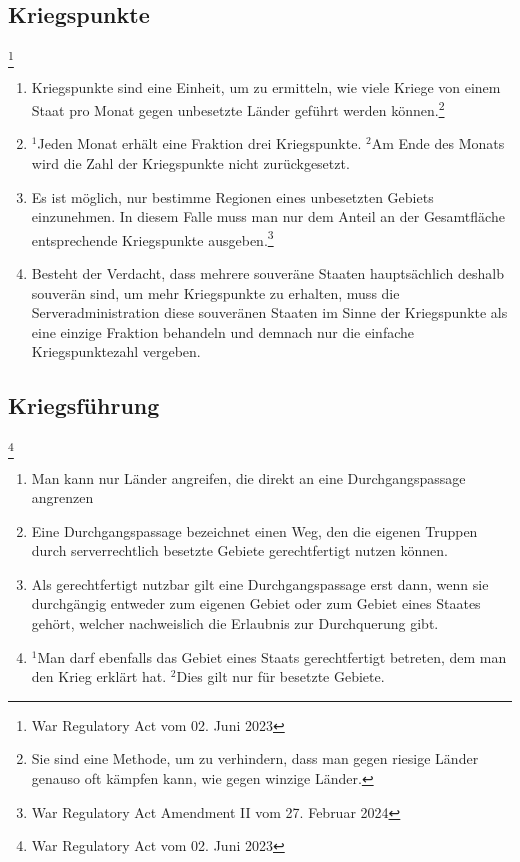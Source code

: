 \documentclass{article}
\newcommand{\sent}[1]{$^{#1}$}
\begin{document}
\subsection{Kriegspunkte}\footnote{War Regulatory Act vom 02. Juni 2023}
\begin{enumerate}[(1)]
	\item Kriegspunkte sind eine Einheit, um zu ermitteln, wie viele Kriege von einem Staat pro Monat gegen unbesetzte Länder geführt werden können.\footnote{Sie sind eine Methode, um zu verhindern, dass man gegen riesige Länder genauso oft kämpfen kann, wie gegen winzige Länder.}
	\item \sent{1}Jeden Monat erhält eine Fraktion drei Kriegspunkte. \sent{2}Am Ende des Monats wird die Zahl der Kriegspunkte nicht zurückgesetzt. %
	\item Es ist möglich, nur bestimme Regionen eines unbesetzten Gebiets einzunehmen. In diesem Falle muss man nur dem Anteil an der Gesamtfläche entsprechende Kriegspunkte ausgeben.\footnote{War Regulatory Act Amendment II vom 27. Februar 2024}
	\item Besteht der Verdacht, dass mehrere souveräne Staaten hauptsächlich deshalb souverän sind, um mehr Kriegspunkte zu erhalten, muss die Serveradministration diese souveränen Staaten im Sinne der Kriegspunkte als eine einzige Fraktion behandeln und demnach nur die einfache Kriegspunktezahl vergeben. %
\end{enumerate}

\subsection{Kriegsführung}\footnote{War Regulatory Act vom 02. Juni 2023}
\begin{enumerate}[(1)]
	\item Man kann nur Länder angreifen, die direkt an eine Durchgangspassage angrenzen
	\item Eine Durchgangspassage bezeichnet einen Weg, den die eigenen Truppen durch serverrechtlich besetzte Gebiete gerechtfertigt nutzen können.
	\item Als gerechtfertigt nutzbar gilt eine Durchgangspassage erst dann, wenn sie durchgängig entweder zum eigenen Gebiet oder zum Gebiet eines Staates gehört, welcher nachweislich die Erlaubnis zur Durchquerung gibt.
	\item \sent{1}Man darf ebenfalls das Gebiet eines Staats gerechtfertigt betreten, dem man den Krieg erklärt hat. \sent{2}Dies gilt nur für besetzte Gebiete.
\end{enumerate}
\end{document}
